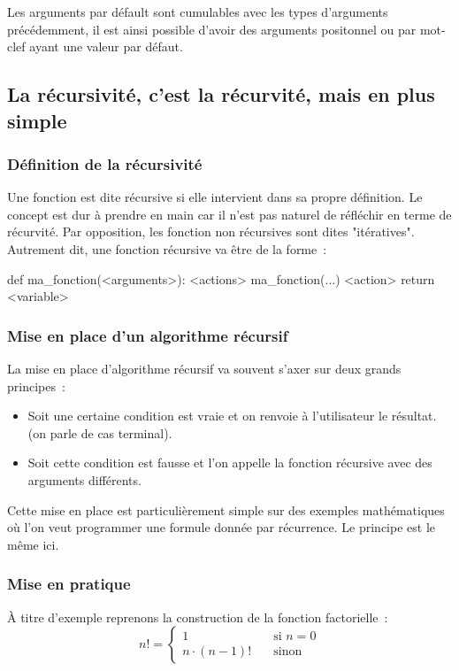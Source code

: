 		Les arguments par défault sont cumulables avec les types d'arguments précédemment, il est ainsi possible d'avoir des arguments positonnel ou par mot-clef ayant une valeur par défaut.
	
	\subsection{La récursivité, c'est la récurvité, mais en plus simple}
		
		\subsubsection{Définition de la récursivité}
		Une fonction est dite récursive si elle intervient dans sa propre définition. Le concept est dur à prendre en main car il n'est pas naturel de réfléchir en terme de récurvité. Par opposition, les fonction non récursives sont dites "itératives". Autrement dit, une fonction récursive va être de la forme~:
		
		\begin{pythoncode}
			def ma_fonction(<arguments>):
				<actions>
				ma_fonction(...)
				<action>
				return <variable>
		\end{pythoncode}
		
		\subsubsection{Mise en place d'un algorithme récursif}
		La mise en place d'algorithme récursif va souvent s'axer sur deux grands principes~:
		\begin{itemize}
			\item Soit une certaine condition est vraie et on renvoie à l'utilisateur le résultat. (on parle de cas terminal).
			\item Soit cette condition est fausse et l'on appelle la fonction récursive avec des arguments différents.
		\end{itemize}
		
		Cette mise en place est particulièrement simple sur des exemples mathématiques où l'on veut programmer une formule donnée par récurrence. Le principe est le même ici.
		
		\subsubsection{Mise en pratique}
		À titre d'exemple reprenons la construction de la fonction factorielle~:
		\[ n! = \left \{ \begin{array}{ll}
			1 & \quad \textrm{si $n = 0$} \\
			n \cdot (n - 1)! & \quad \textrm{sinon}
		\end{array} \right . \]
		

